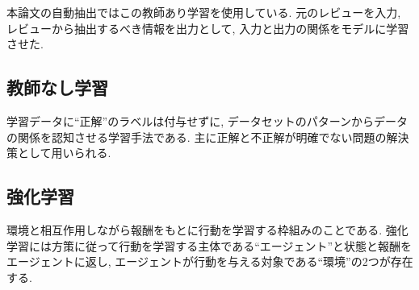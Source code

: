 本論文の自動抽出ではこの教師あり学習を使用している. 元のレビューを入力, レビューから抽出するべき情報を出力として, 入力と出力の関係をモデルに学習させた.

\subsection{教師なし学習}
学習データに``正解''のラベルは付与せずに, データセットのパターンからデータの関係を認知させる学習手法である. 主に正解と不正解が明確でない問題の解決策として用いられる. 


\subsection{強化学習}
環境と相互作用しながら報酬をもとに行動を学習する枠組みのことである. 強化学習には方策に従って行動を学習する主体である``エージェント''と状態と報酬をエージェントに返し, エージェントが行動を与える対象である``環境''の2つが存在する. 






